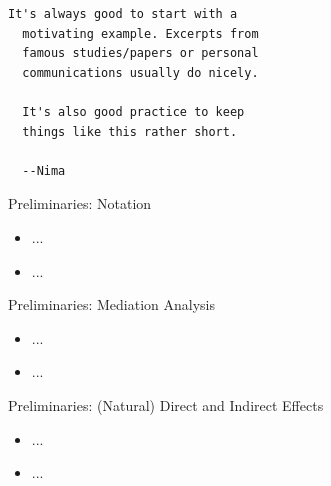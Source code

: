 \documentclass[12pt,t]{beamer}
\begin{document}
\begin{frame}[fragile,c]{}

\begin{center}
\begin{minipage}[c]{9.3cm}
\begin{semiverbatim}
\lstset{basicstyle=\normalsize}
\begin{lstlisting}[linewidth=9.3cm]
  It's always good to start with a
  motivating example. Excerpts from
  famous studies/papers or personal
  communications usually do nicely.

  It's also good practice to keep
  things like this rather short.

  --Nima
\end{lstlisting}
\end{semiverbatim}
\end{minipage}
\end{center}

\end{frame}



\begin{frame}[c]{Preliminaries: Notation}

\begin{center}
\begin{itemize}
  \item ...
  \item ...
\end{itemize}
\end{center}


\end{frame}



\begin{frame}[c]{Preliminaries: Mediation Analysis}

\begin{center}
\begin{itemize}
  \item ...
  \item ...
\end{itemize}
\end{center}


\end{frame}



\begin{frame}[c]{Preliminaries: (Natural) Direct and Indirect Effects}

\begin{center}
\begin{itemize}
  \item ...
  \item ...
\end{itemize}
\end{center}


\end{frame}
\end{document}
